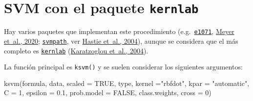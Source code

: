 \documentclass[
  spanish,
]{book}
\newenvironment{Shaded}{\begin{snugshade}}{\end{snugshade}}
\newcommand{\AttributeTok}[1]{\textcolor[rgb]{0.77,0.63,0.00}{#1}}
\newcommand{\ConstantTok}[1]{\textcolor[rgb]{0.00,0.00,0.00}{#1}}
\newcommand{\DecValTok}[1]{\textcolor[rgb]{0.00,0.00,0.81}{#1}}
\newcommand{\FloatTok}[1]{\textcolor[rgb]{0.00,0.00,0.81}{#1}}
\newcommand{\FunctionTok}[1]{\textcolor[rgb]{0.00,0.00,0.00}{#1}}
\newcommand{\NormalTok}[1]{#1}
\newcommand{\StringTok}[1]{\textcolor[rgb]{0.31,0.60,0.02}{#1}}
\theoremstyle{break}
\theoremstyle{definition}
\theoremstyle{definition}
\theoremstyle{definition}
\theoremstyle{definition}
\theoremstyle{remark}
\begin{document}
\hypertarget{svm-con-el-paquete-kernlab}{%
\section{\texorpdfstring{SVM con el paquete \texttt{kernlab}}{SVM con el paquete kernlab}}\label{svm-con-el-paquete-kernlab}}

Hay varios paquetes que implementan este procedimiento (e.g.~\href{https://CRAN.R-project.org/package=e1071}{\texttt{e1071}}, \protect\hyperlink{ref-R-e1071}{Meyer et~al., 2020}; \href{https://CRAN.R-project.org/package=svmpath}{\texttt{svmpath}}, ver \protect\hyperlink{ref-hastie2004entire}{Hastie et~al., 2004}), aunque se considera que el más completo es \href{https://CRAN.R-project.org/package=kernlab}{\texttt{kernlab}} (\protect\hyperlink{ref-kernlab2004}{Karatzoglou et~al., 2004}).

La función principal es \texttt{ksvm()} y se suelen considerar los siguientes argumentos:

\begin{Shaded}
\begin{Highlighting}[]
\FunctionTok{ksvm}\NormalTok{(formula, data, }\AttributeTok{scaled =} \ConstantTok{TRUE}\NormalTok{, type,}
  \AttributeTok{kernel =}\StringTok{"rbfdot"}\NormalTok{, }\AttributeTok{kpar =} \StringTok{"automatic"}\NormalTok{,}
  \AttributeTok{C =} \DecValTok{1}\NormalTok{, }\AttributeTok{epsilon =} \FloatTok{0.1}\NormalTok{, }\AttributeTok{prob.model =} \ConstantTok{FALSE}\NormalTok{, }
\NormalTok{  class.weights, }\AttributeTok{cross =} \DecValTok{0}\NormalTok{)}
\end{Highlighting}
\end{Shaded}
\end{document}
